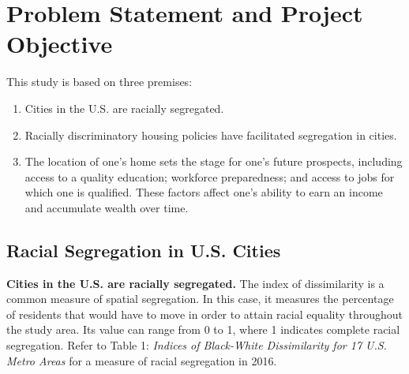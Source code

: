 \documentclass[paper=letter, fontsize=12pt]{scrartcl} %
\begin{document}
\section{Problem Statement and Project Objective}
This study is based on three premises:
\begin{enumerate}
	\item Cities in the U.S. are racially segregated.
	\item Racially discriminatory housing policies have facilitated segregation in cities.
	\item The location of one's home sets the stage for one's future prospects, including access to a quality education; workforce preparedness; and access to jobs for which one is qualified. These factors affect one's ability to earn an income and accumulate wealth over time.
\end{enumerate}

\subsection{Racial Segregation in U.S. Cities}
\textbf{Cities in the U.S. are racially segregated.} The index of dissimilarity is a common measure of spatial segregation. In this case, it measures the percentage of residents that would have to move in order to attain racial equality throughout the study area. Its value can range from 0 to 1, where 1 indicates complete racial segregation. \cite{duncan} Refer to Table 1: \textit{Indices of Black-White Dissimilarity for 17 U.S. Metro Areas} for a measure of racial segregation in 2016.\par
\end{document}
